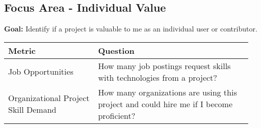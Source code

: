 
\subsection{Focus Area - Individual Value}
\textbf{Goal:} Identify if a project is valuable to me as an individual user or contributor.
\begin{table}[ht!]
    \centering
    \begin{tabular}{|p{0.35\linewidth} | p{0.6\linewidth}|}
        \hline
        \hfil \textbf{Metric}  & \hfil \textbf{Question} \\
        \hline
    		Job Opportunities & How many job postings request skills with technologies from a project? \\ 
		\hline
		Organizational Project Skill Demand & How many organizations are using this project and could hire me if I become proficient? \\ 
		\hline
    \end{tabular}
\end{table}
    
 
 
